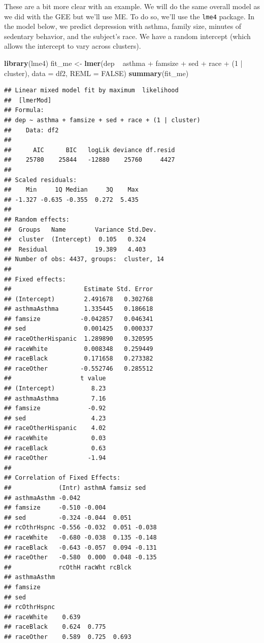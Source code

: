 \documentclass[]{tufte-book}
\newenvironment{Shaded}{}{}
\newcommand{\KeywordTok}[1]{\textcolor[rgb]{0.00,0.44,0.13}{\textbf{#1}}}
\newcommand{\DataTypeTok}[1]{\textcolor[rgb]{0.56,0.13,0.00}{#1}}
\newcommand{\DecValTok}[1]{\textcolor[rgb]{0.25,0.63,0.44}{#1}}
\newcommand{\StringTok}[1]{\textcolor[rgb]{0.25,0.44,0.63}{#1}}
\newcommand{\OtherTok}[1]{\textcolor[rgb]{0.00,0.44,0.13}{#1}}
\newcommand{\OperatorTok}[1]{\textcolor[rgb]{0.40,0.40,0.40}{#1}}
\newcommand{\NormalTok}[1]{#1}
\theoremstyle{definition}
\theoremstyle{definition}
\theoremstyle{remark}
\begin{document}
These are a bit more clear with an example. We will do the same overall
model as we did with the GEE but we'll use ME. To do so, we'll use the
\texttt{lme4} package. In the model below, we predict depression with
asthma, family size, minutes of sedentary behavior, and the subject's
race. We have a random intercept (which allows the intercept to vary
across clusters).

\begin{Shaded}
\begin{Highlighting}[]
\KeywordTok{library}\NormalTok{(lme4)}
\NormalTok{fit_me <-}\StringTok{ }\KeywordTok{lmer}\NormalTok{(dep }\OperatorTok{~}\StringTok{ }\NormalTok{asthma }\OperatorTok{+}\StringTok{ }\NormalTok{famsize }\OperatorTok{+}\StringTok{ }\NormalTok{sed }\OperatorTok{+}\StringTok{ }
\StringTok{    }\NormalTok{race }\OperatorTok{+}\StringTok{ }\NormalTok{(}\DecValTok{1} \OperatorTok{|}\StringTok{ }\NormalTok{cluster), }\DataTypeTok{data =}\NormalTok{ df2, }\DataTypeTok{REML =} \OtherTok{FALSE}\NormalTok{)}
\KeywordTok{summary}\NormalTok{(fit_me)}
\end{Highlighting}
\end{Shaded}

\begin{verbatim}
## Linear mixed model fit by maximum  likelihood
##  [lmerMod]
## Formula: 
## dep ~ asthma + famsize + sed + race + (1 | cluster)
##    Data: df2
## 
##      AIC      BIC   logLik deviance df.resid 
##    25780    25844   -12880    25760     4427 
## 
## Scaled residuals: 
##    Min     1Q Median     3Q    Max 
## -1.327 -0.635 -0.355  0.272  5.435 
## 
## Random effects:
##  Groups   Name        Variance Std.Dev.
##  cluster  (Intercept)  0.105   0.324   
##  Residual             19.389   4.403   
## Number of obs: 4437, groups:  cluster, 14
## 
## Fixed effects:
##                    Estimate Std. Error
## (Intercept)        2.491678   0.302768
## asthmaAsthma       1.335445   0.186618
## famsize           -0.042857   0.046341
## sed                0.001425   0.000337
## raceOtherHispanic  1.289890   0.320595
## raceWhite          0.008348   0.259449
## raceBlack          0.171658   0.273382
## raceOther         -0.552746   0.285512
##                   t value
## (Intercept)          8.23
## asthmaAsthma         7.16
## famsize             -0.92
## sed                  4.23
## raceOtherHispanic    4.02
## raceWhite            0.03
## raceBlack            0.63
## raceOther           -1.94
## 
## Correlation of Fixed Effects:
##             (Intr) asthmA famsiz sed   
## asthmaAsthm -0.042                     
## famsize     -0.510 -0.004              
## sed         -0.324 -0.044  0.051       
## rcOthrHspnc -0.556 -0.032  0.051 -0.038
## raceWhite   -0.680 -0.038  0.135 -0.148
## raceBlack   -0.643 -0.057  0.094 -0.131
## raceOther   -0.580  0.000  0.048 -0.135
##             rcOthH racWht rcBlck
## asthmaAsthm                     
## famsize                         
## sed                             
## rcOthrHspnc                     
## raceWhite    0.639              
## raceBlack    0.624  0.775       
## raceOther    0.589  0.725  0.693
\end{verbatim}
\end{document}

